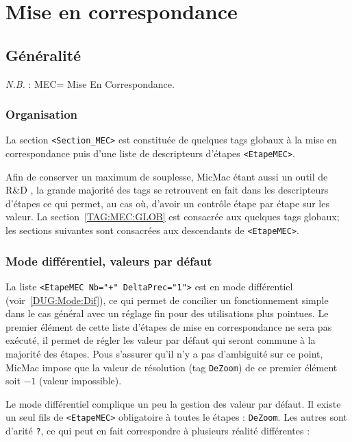
\chapter{Mise en correspondance}



\section{G\'en\'eralit\'e}

\emph{N.B.} : MEC= Mise En Correspondance.

\subsection{Organisation}

\label{ORG:MEC}

La section {\tt <Section\_MEC>} est constitu\'ee de quelques 
tags globaux \`a la mise en correspondance puis d'une liste 
de descripteurs d'\'etapes {\tt <EtapeMEC>}. 

Afin de conserver un maximum de souplesse,
MicMac \'etant aussi un outil de R\&D , la grande
majorit\'e des tags se  retrouvent en fait dans
les descripteurs d'\'etapes ce qui permet, au cas o\`u,
d'avoir un contr\^ole \'etape par \'etape sur les valeur.
La section~\ref{TAG:MEC:GLOB} est consacr\'ee aux quelques
tags globaux; les sections suivantes sont consacr\'ees  aux
descendants de {\tt <EtapeMEC>}.

\subsection{Mode diff\'erentiel, valeurs par d\'efaut}

La liste {\tt <EtapeMEC  Nb="+" DeltaPrec="1">} est en mode
diff\'erentiel (voir~\ref{DUG:Mode:Dif}), ce qui permet 
de concilier un fonctionnement simple dans le cas g\'en\'eral
avec un r\'eglage fin pour des utilisations plus pointues.
Le premier \'el\'ement de cette liste d'\'etapes de mise
en correspondance ne sera pas ex\'ecut\'e, il permet de
r\'egler les valeur par d\'efaut qui seront commune \`a
la majorit\'e des \'etapes.  Pous s'assurer qu'il n'y a
pas d'ambiguit\'e sur ce point, MicMac impose que la valeur
de r\'esolution (tag {\tt DeZoom})  de ce premier \'el\'ement
soit $-1$ (valeur impossible).

Le mode diff\'erentiel complique un peu la gestion des valeur
par d\'efaut. Il existe un seul fils de {\tt <EtapeMEC>} obligatoire
\`a toutes le \'etapes : {\tt DeZoom}. Les autres sont d'arit\'e {\tt ?},
ce qui peut en fait correspondre \`a plusieurs r\'ealit\'e diff\'erentes :

